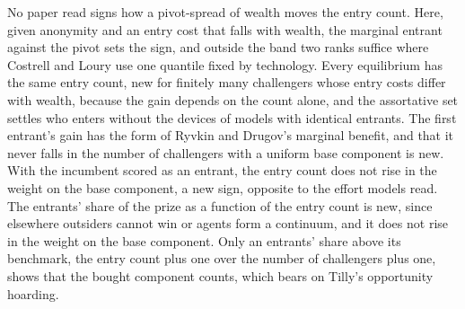 No paper read signs how a pivot-spread of wealth moves the entry count. Here,
given anonymity and an entry cost that falls with wealth, the marginal entrant
against the pivot sets the sign, and outside the band two ranks suffice where
Costrell and Loury use one quantile fixed by technology. Every equilibrium has
the same entry count, new for finitely many challengers whose entry costs differ
with wealth, because the gain depends on the count alone, and the assortative
set settles who enters without the devices of models with identical entrants.
The first entrant's gain has the form of Ryvkin and Drugov's marginal benefit,
and that it never falls in the number of challengers with a uniform base
component is new. With the incumbent scored as an entrant, the entry count does
not rise in the weight on the base component, a new sign, opposite to the effort
models read. The entrants' share of the prize as a function of the entry count
is new, since elsewhere outsiders cannot win or agents form a continuum, and it
does not rise in the weight on the base component. Only an entrants' share above
its benchmark, the entry count plus one over the number of challengers plus one,
shows that the bought component counts, which bears on Tilly's opportunity
hoarding.

